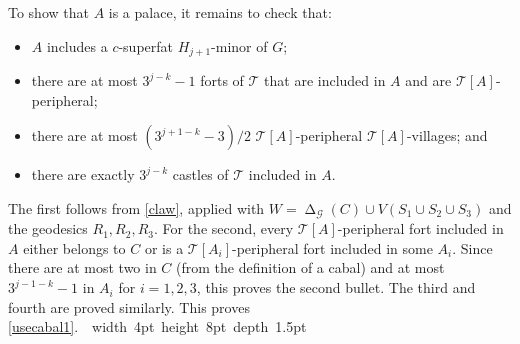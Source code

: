 \documentclass[titlepage,11pt]{article}
\newcommand\blackslug{\hbox{\hskip 1pt \vrule width 4pt height 8pt depth 1.5pt
		\hskip 1pt}}
\newcommand\bbox{\hfill \quad \blackslug \bigbreak}
\newcommand{\voro}{\operatorname{\Delta}}
\newcommand{\mac}{\mathcal}
\begin{document}
	To show that $A$ is a palace, it remains to check that:
	\begin{itemize}
		\item $A$ includes a $c$-superfat $H_{j+1}$-minor of $G$;
		\item there are at most $3^{j-k}-1$ forts of $\mac T$ that are included in $A$ and are $\mac T[A]$-peripheral;
		\item there are at most $(3^{j+1-k}-3)/2$ $\mac T[A]$-peripheral $\mac T[A]$-villages; and
		\item there are exactly $3^{j-k}$ castles of $\mac T$ included in $A$.
	\end{itemize}
	The first follows from \ref{claw}, applied with $W=\voro_{\mac G}(C)\cup V(S_1\cup S_2\cup S_3)$ and the geodesics $R_1,R_2,R_3$.
	For the second, every $\mac T[A]$-peripheral fort included in $A$ either belongs to $C$ or is a $\mac T[A_i]$-peripheral fort
	included in some $A_i$. Since there are at most two in $C$ (from the definition of a cabal) and at most $3^{j-1-k}-1$ in $A_i$
	for $i = 1,2,3$, this proves the second bullet. The third and fourth are proved similarly. This proves \ref{usecabal1}.~\bbox
	
\end{document}

